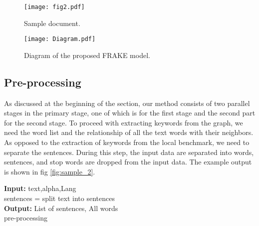 \documentclass[3p]{elsarticle}
\begin{document}
\begin{figure}
    \centering
    \texttt{[image: fig2.pdf]}
    \caption{Sample document.}
    \label{fig:sample_1}
\end{figure}



\begin{figure}
    \centering
    \texttt{[image: Diagram.pdf]}
    \caption{Diagram of the proposed FRAKE model.}
    \label{fig:diagram}
\end{figure}

















\subsection{Pre-processing}
As discussed at the beginning of the section, our method consists of two parallel stages in the primary stage, one of which is for the first stage and the second part for the second stage. To proceed with extracting keywords from the graph, we need the word list and the relationship of all the text words with their neighbors. As opposed to the extraction of keywords from the local benchmark, we need to separate the sentences. During this step, the input data are separated into words, sentences, and stop words are dropped from the input data. The example output is shown in fig \ref{fig:sample_2}.

\begin{algorithm}
\SetAlgoLined

 \textbf{Input:} text,alpha,Lang \\
 sentences = split text into sentences\\
\textbf{Output:} List of sentences, All words\\

\caption{pre-processing}
\label{alg:pre-processing}
\end{algorithm}
\end{document}
